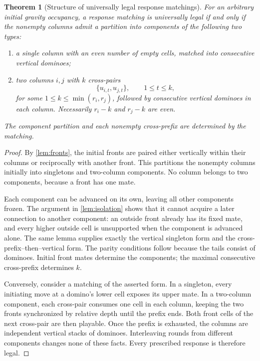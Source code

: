 \documentclass[11pt]{article}
\newtheorem{theorem}{Theorem}[section]
\theoremstyle{definition}
\theoremstyle{remark}
\begin{document}
\begin{theorem}[Structure of universally legal response matchings]\label{thm:structure}
For an arbitrary initial gravity occupancy, a response matching is
universally legal if and only if the nonempty columns admit a partition
into components of the following two types:
\begin{enumerate}[label=(\alph*)]
\item a single column with an even number of empty cells, matched into
consecutive vertical dominoes;
\item two columns $i,j$ with $k$ cross-pairs
\[
 \{u_{i,t},u_{j,t}\},\qquad 1\le t\le k,
\]
for some $1\le k\le\min(r_i,r_j)$, followed by consecutive vertical
dominoes in each column. Necessarily $r_i-k$ and $r_j-k$ are even.
\end{enumerate}
The component partition and each nonempty cross-prefix are determined by
the matching.
\end{theorem}
\begin{proof}
By \cref{lem:fronts}, the initial fronts are paired either vertically
within their columns or reciprocally with another front. This partitions
the nonempty columns initially into singletons and two-column components.
No column belongs to two components, because a front has one mate.

Each component can be advanced on its own, leaving all other components
frozen. The argument in \cref{lem:isolation} shows that it cannot acquire a
later connection to another component: an outside front already has its
fixed mate, and every higher outside cell is unsupported when the component
is advanced alone. The same lemma supplies exactly the vertical singleton
form and the cross-prefix--then--vertical form. The parity conditions follow
because the tails consist of dominoes. Initial front mates determine the
components; the maximal consecutive cross-prefix determines $k$.

Conversely, consider a matching of the asserted form. In a singleton,
every initiating move at a domino's lower cell exposes its upper mate.
In a two-column component, each cross-pair consumes one cell in each
column, keeping the two fronts synchronized by relative depth until the
prefix ends. Both front cells of the next cross-pair are then playable.
Once the prefix is exhausted, the columns are independent vertical stacks
of dominoes. Interleaving rounds from different components changes none of
these facts. Every prescribed response is therefore legal.
\end{proof}
\end{document}
